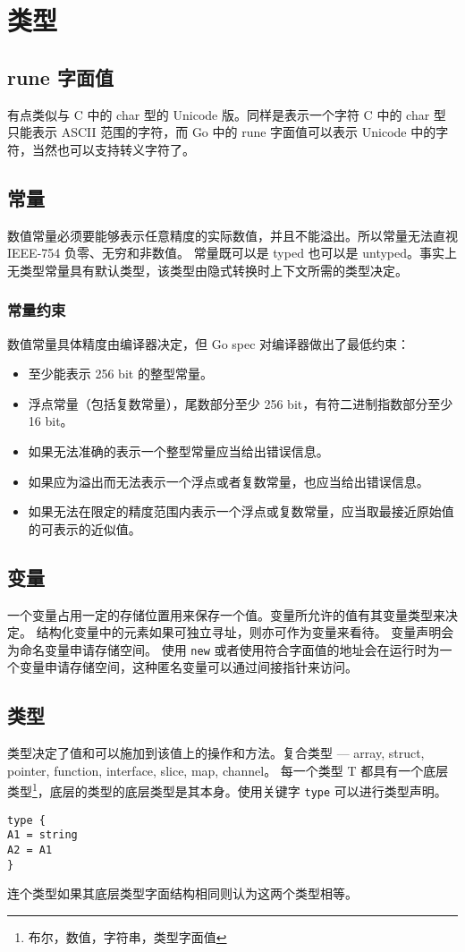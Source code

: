 %
\chapter{类型}

\section{rune 字面值} 
\label{rune-literal}
有点类似与 C 中的 char 型的 Unicode 版。同样是表示一个字符 C 中的 char 型只能表示 ASCII 范围的字符，而 Go 中的 rune 字面值可以表示 Unicode 中的字符，当然也可以支持转义字符了。

\section{常量}
数值常量必须要能够表示任意精度的实际数值，并且不能溢出。所以常量无法直视 IEEE-754 负零、无穷和非数值。
常量既可以是 typed 也可以是 untyped。事实上无类型常量具有默认类型，该类型由隐式转换时上下文所需的类型决定。
\subsection{常量约束}
数值常量具体精度由编译器决定，但 Go spec 对编译器做出了最低约束：
\begin{itemize}
	\item 至少能表示 256 bit 的整型常量。
	\item 浮点常量（包括复数常量），尾数部分至少 256 bit，有符二进制指数部分至少 16 bit。
	\item 如果无法准确的表示一个整型常量应当给出错误信息。
	\item 如果应为溢出而无法表示一个浮点或者复数常量，也应当给出错误信息。
	\item 如果无法在限定的精度范围内表示一个浮点或复数常量，应当取最接近原始值的可表示的近似值。
\end{itemize}

\section{变量}
一个变量占用一定的存储位置用来保存一个值。变量所允许的值有其变量类型来决定。
结构化变量中的元素如果可独立寻址，则亦可作为变量来看待。
变量声明会为命名变量申请存储空间。
使用 \verb|new| 或者使用符合字面值的地址会在运行时为一个变量申请存储空间，这种匿名变量可以通过间接指针来访问。

\section{类型}
类型决定了值和可以施加到该值上的操作和方法。复合类型 --- array, struct, pointer, function, interface, slice, map, channel。
每一个类型 T 都具有一个底层类型\footnote{布尔，数值，字符串，类型字面值}，底层的类型的底层类型是其本身。使用关键字 \verb|type| 可以进行类型声明。
\begin{lstlisting}[language=golang, frame=single]
type {
A1 = string
A2 = A1
}
\end{lstlisting}
连个类型如果其底层类型字面结构相同则认为这两个类型相等。
